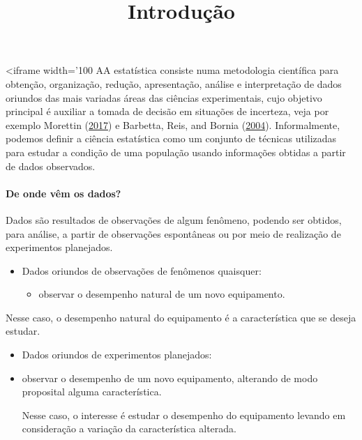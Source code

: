 \documentclass[
]{article}
\title{Introdução}
\author{}
\date{\vspace{-2.5em}}
\providecommand{\tightlist}{%
  \setlength{\itemsep}{0pt}\setlength{\parskip}{0pt}}
\begin{document}
\maketitle

\newtheorem{exemplo}{Exemplo}
\newtheorem{assumption}{Assumption}
\renewcommand{\thesection}{\Alph{Seções}}
<iframe width='100%
AA estatística consiste numa metodologia científica para obtenção,
organização, redução, apresentação, análise e interpretação de dados
oriundos das mais variadas áreas das ciências experimentais, cujo
objetivo principal é auxiliar a tomada de decisão em situações de
incerteza, veja por exemplo Morettin
(\protect\hyperlink{ref-bussab}{2017}) e Barbetta, Reis, and Bornia
(\protect\hyperlink{ref-barbetta2004}{2004}). Informalmente, podemos
definir a ciência estatística como um conjunto de técnicas utilizadas
para estudar a condição de uma população usando informações obtidas a
partir de dados observados.

\hypertarget{de-onde-vuxeam-os-dados}{%
\paragraph{De onde vêm os dados?}\label{de-onde-vuxeam-os-dados}}

Dados são resultados de observações de algum fenômeno, podendo ser
obtidos, para análise, a partir de observações espontâneas ou por meio
de realização de experimentos planejados.

\begin{itemize}
\tightlist
\item
  Dados oriundos de observações de fenômenos quaisquer:

  \begin{itemize}
  \tightlist
  \item
    observar o desempenho natural de um novo equipamento.
  \end{itemize}
\end{itemize}

Nesse caso, o desempenho natural do equipamento é a característica que
se deseja estudar.

\begin{itemize}
\item
  Dados oriundos de experimentos planejados:
\item
  observar o desempenho de um novo equipamento, alterando de modo
  proposital alguma característica.

  Nesse caso, o interesse é estudar o desempenho do equipamento levando
  em consideração a variação da característica alterada.
\end{itemize}
\end{document}

